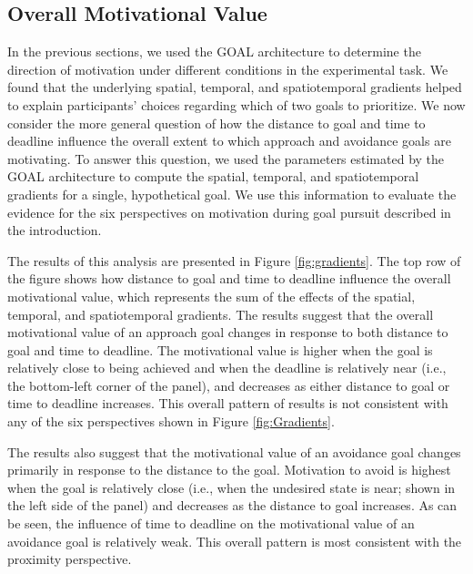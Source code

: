 \documentclass[a4paper,doc,natbib,donotrepeattitle]{apa6}
\begin{document}
\subsection{Overall Motivational Value}

In the previous sections, we used the GOAL architecture to determine the direction of motivation under different conditions in the experimental task. We found that the underlying spatial, temporal, and spatiotemporal gradients helped to explain participants' choices regarding which of two goals to prioritize. We now consider the more general question of how the distance to goal and time to deadline influence the overall extent to which approach and avoidance goals are motivating. To answer this question, we used the parameters estimated by the GOAL architecture to compute the spatial, temporal, and spatiotemporal gradients for a single, hypothetical goal. We use this information to evaluate the evidence for the six perspectives on motivation during goal pursuit described in the introduction.

The results of this analysis are presented in Figure \ref{fig:gradients}. The top row of the figure shows how distance to goal and time to deadline influence the overall motivational value, which represents the sum of the effects of the spatial, temporal, and spatiotemporal gradients. The results suggest that the overall motivational value of an approach goal changes in response to both distance to goal and time to deadline. The motivational value is higher when the goal is relatively close to being achieved and when the deadline is relatively near (i.e., the bottom-left corner of the panel), and decreases as either distance to goal or time to deadline increases. This overall pattern of results is not consistent with any of the six perspectives shown in Figure \ref{fig:Gradients}.

The results also suggest that the motivational value of an avoidance goal changes primarily in response to the distance to the goal. Motivation to avoid is highest when the goal is relatively close (i.e., when the undesired state is near; shown in the left side of the panel) and decreases as the distance to goal increases. As can be seen, the influence of time to deadline on the motivational value of an avoidance goal is relatively weak. This overall pattern is most consistent with the proximity perspective.
\end{document}
